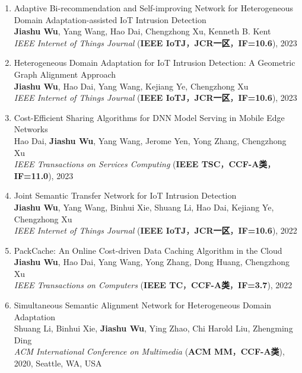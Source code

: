 \documentclass[UTF8,letterpaper,10.9pt]{article}
\begin{document}
\begin{enumerate}
  \setlength\itemsep{1pt}
  \item Adaptive Bi-recommendation and Self-improving Network for Heterogeneous Domain Adaptation-assisted IoT Intrusion Detection\\
  \textbf{Jiashu Wu}, Yang Wang\textsuperscript{\Letter}, Hao Dai, Chengzhong Xu, Kenneth B. Kent\\
  \textit{IEEE Internet of Things Journal} (\textbf{IEEE IoTJ}，\textbf{JCR一区}，\textbf{IF=10.6}), 2023

  \item Heterogeneous Domain Adaptation for IoT Intrusion Detection: A Geometric Graph Alignment Approach\\
  \textbf{Jiashu Wu}, Hao Dai, Yang Wang\textsuperscript{\Letter}, Kejiang Ye, Chengzhong Xu\\
  \textit{IEEE Internet of Things Journal} (\textbf{IEEE IoTJ}，\textbf{JCR一区}，\textbf{IF=10.6}), 2023

  \item Cost-Efficient Sharing Algorithms for DNN Model Serving in Mobile Edge Networks\\
  Hao Dai, \textbf{Jiashu Wu}, Yang Wang\textsuperscript{\Letter}, Jerome Yen, Yong Zhang, Chengzhong Xu\\
  \textit{IEEE Transactions on Services Computing} (\textbf{IEEE TSC}，\textbf{CCF-A类}，\textbf{IF=11.0}), 2023

  \item Joint Semantic Transfer Network for IoT Intrusion Detection\\
  \textbf{Jiashu Wu}, Yang Wang\textsuperscript{\Letter}, Binhui Xie, Shuang Li, Hao Dai, Kejiang Ye, Chengzhong Xu\\
  \textit{IEEE Internet of Things Journal} (\textbf{IEEE IoTJ}，\textbf{JCR一区}，\textbf{IF=10.6}), 2022

  \item PackCache: An Online Cost-driven Data Caching Algorithm in the Cloud\\
  \textbf{Jiashu Wu}, Hao Dai, Yang Wang\textsuperscript{\Letter}, Yong Zhang, Dong Huang, Chengzhong Xu\\
  \textit{IEEE Transactions on Computers} (\textbf{IEEE TC}，\textbf{CCF-A类}，\textbf{IF=3.7}), 2022

  \item Simultaneous Semantic Alignment Network for Heterogeneous Domain Adaptation\\
  Shuang Li, Binhui Xie, \textbf{Jiashu Wu}, Ying Zhao, Chi Harold Liu\textsuperscript{\Letter}, Zhengming Ding\\
  \textit{ACM International Conference on Multimedia} (\textbf{ACM MM}，\textbf{CCF-A类}), 2020, Seattle, WA, USA


\end{enumerate}
\end{document}
